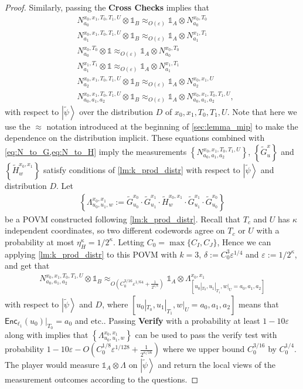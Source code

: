 \documentclass[11pt]{article}
\theoremstyle{plain}
\theoremstyle{definition}
\newcommand {\set} [1] {\ensuremath{ \left\lbrace #1 \right\rbrace }}
\newcommand {\ket} [1] {\ensuremath{ \left| #1 \right\rangle }}
\newcommand {\id} {\ensuremath{\mathds{1}}}
\newcommand{\ep} {\ensuremath{\varepsilon}}
\newcommand{\x}{\otimes}
\newcommand{\appd}[1]{\approx_{#1}}
\newcommand{\1}{\mathbb{1}} %
\newcommand{\tG}{\tilde{G}}
\newcommand{\tH}{\tilde{H}}
\newcommand{\tpsi}{\tilde{\psi}}
\newcommand{\Enc}{\mathsf{Enc}}
\begin{document}
\begin{proof}
Similarly, passing the \textbf{Cross Checks} implies that
\begin{align}
	&N^{x_0, x_1, T_0, T_1, U}_{a_0} \x \id_B \appd{O(\ep)} \id_A \x N^{x_0, T_0}_{a_0} \\
	&N^{x_0, x_1, T_0, T_1, U}_{a_1} \x \id_B \appd{O(\ep)} \id_A \x N^{x_1, T_1}_{a_1} \\
	\label{eq:Nx0_consist}
	&N^{x_0, T_0}_{a_0} \x \id \appd{O(\ep)} \id_A \x N^{x_0, T_0}_{a_0} \\
	\label{eq:Nx1_consist}
	&N^{x_1, T_1}_{a_1} \x \id \appd{O(\ep)} \id_A \x N^{x_1, T_1}_{a_1} \\
	&N^{x_0, x_1, T_0, T_1, U}_{a_2} \x \id_B \appd{O(\ep)} \id_A \x N^{x_0, x_1, U}_{a_2} \\  
	&N^{x_0, x_1, T_0, T_1, U}_{a_0,a_1,a_2} \x \id_B \appd{O(\ep)} \id_A \x N^{x_0, x_1, T_0, T_1, U}_{a_0,a_1,a_2},
\end{align}
with respect to $\ket{\tpsi}$ over the distribution $D$ of $x_0, x_1, T_0, T_1, U$.
Note that here we use the $\approx$ notation introduced at the beginning of \cref{sec:lemma_mip}
to make the dependence on the distribution implicit.
These equations combined with \cref{eq:N_to_G,eq:N_to_H} imply the 
measurements $\set{ N^{x_0,x_1,T_0,T_1,U}_{a_0, a_1, a_2} }$, $\set{ \tG^x_u }$ and $\set{\tH^{x_0,x_1}_w}$ satisfy
conditions of \cref{lm:k_prod_distr} with respect to $\ket{\tpsi}$ and distribution $D$.
Let 
\begin{align*}
	\set{ \Lambda^{x_0,x_1}_{u_0,u_1,w} := \tG^{x_0}_{u_0} \cdot \tG^{x_1}_{u_1} \cdot \tH^{x_0,x_1}_{w} \cdot \tG^{x_1}_{u_1} \cdot 
	\tG^{x_0}_{u_0}}
\end{align*}
be a POVM constructed following \cref{lm:k_prod_distr}. 
Recall that $T_c$ and $U$ has $\kappa$ independent coordinates, so two different codewords agree on $T_c$ or $U$ with a probability at most 
$\eta_H^\kappa = 1/2^\kappa$.
Letting $C_0 = \max\{C_I, C_J\}$,
Hence we can applying \cref{lm:k_prod_distr} to this POVM with $k = 3$, $\delta := C_0^3\ep^{1/4} $ and $\ep:=1/2^{\kappa}$, and get that 
\begin{align}
	\label{eq:N_to_Lambda}
	N^{x_0, x_1, T_0, T_1, U}_{a_0,a_1,a_2} \x \id_B \appd{O(C_0^{3/16}\ep^{1/64} + \frac{1}{2^{\kappa/8}})} \id_A \x \Lambda^{x_0,x_1}_{[u_0|_{T_0}, u_1|_{T_1}, w|_U =
	a_0,a_1,a_2]} 
\end{align}
with respect to $\ket{\tpsi}$ and $D$, where $[u_0|_{T_0}, u_1|_{T_1}, w|_U =
	a_0,a_1,a_2]$ means that $\Enc_{\ell_1}(u_0)|_{T_0} = a_0$ and etc..
Passing \textbf{Verify} with a probability at least $1 - 10\ep$ along with 
 implies that $\set{\Lambda^{x_0,x_1}_{u_0,u_1,w} }$ can be used to pass the verify test with probability $1 - 10\ep - O(C_0^{1/8}\ep^{1/128} + \frac{1}{2^{\kappa/16}})$ where we upper bound $C_0^{3/16}$ by $C_0^{1/4}$. The player would measure $\id_A \x \Lambda$ on $\ket{\tpsi}$ and return the local views of the measurement outcomes according to the questions. 


\end{proof}
\end{document}
